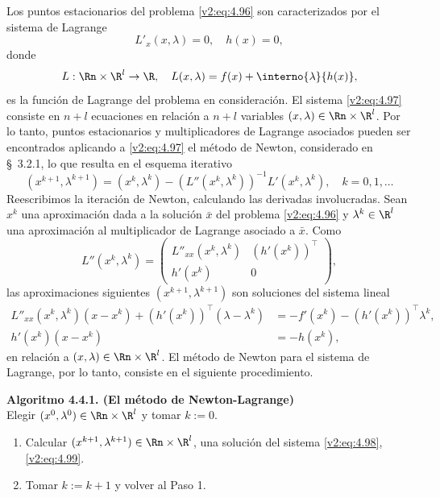 Los puntos estacionarios del problema \eqref{v2:eq:4.96} son caracterizados por el sistema de Lagrange
\begin{equation}
    L'_x(x, \lambda) = 0, \quad h(x) = 0,
    \label{v2:eq:4.97}
\end{equation}
donde
\[
    L : \Rn \times \R^l \to \R, \quad L(x, \lambda) = f(x) + \interno{\lambda}{h(x)},
\]
es la función de Lagrange del problema en consideración. El sistema \eqref{v2:eq:4.97} consiste en $n+l$ ecuaciones en relación a $n+l$ variables $(x, \lambda) \in \Rn \times \R^l$. Por lo tanto, puntos estacionarios y multiplicadores de Lagrange asociados pueden ser encontrados aplicando a \eqref{v2:eq:4.97} el método de Newton, considerado en \S~3.2.1, lo que resulta en el esquema iterativo
\[
    (x^{k+1}, \lambda^{k+1}) = (x^k, \lambda^k) - (L''(x^k, \lambda^k))^{-1} L'(x^k, \lambda^k), \quad k=0, 1, \dots
\]
Reescribimos la iteración de Newton, calculando las derivadas involucradas. Sean $x^k$ una aproximación dada a la solución $\bar{x}$ del problema \eqref{v2:eq:4.96} y $\lambda^k \in \R^l$ una aproximación al multiplicador de Lagrange asociado a $\bar{x}$. Como
\[
    L''(x^k, \lambda^k) = \begin{pmatrix} L''_{xx}(x^k, \lambda^k) & (h'(x^k))^\top \\ h'(x^k) & 0 \end{pmatrix},
\]
las aproximaciones siguientes $(x^{k+1}, \lambda^{k+1})$ son soluciones del sistema lineal
\begin{align}
    L''_{xx}(x^k, \lambda^k)(x - x^k) + (h'(x^k))^\top (\lambda - \lambda^k) &= -f'(x^k) - (h'(x^k))^\top \lambda^k, \label{v2:eq:4.98} \\
    h'(x^k)(x - x^k) &= -h(x^k), \label{v2:eq:4.99}
\end{align}
en relación a $(x, \lambda) \in \Rn \times \R^l$. El método de Newton para el sistema de Lagrange, por lo tanto, consiste en el siguiente procedimiento.

\vspace{0.3cm}
\noindent\textbf{Algoritmo 4.4.1. (El método de Newton-Lagrange)}\\
Elegir $(x^0, \lambda^0) \in \Rn \times \R^l$ y tomar $k:=0$.
\begin{enumerate}
    \item Calcular $(x^{k+1}, \lambda^{k+1}) \in \Rn \times \R^l$, una solución del sistema \eqref{v2:eq:4.98}, \eqref{v2:eq:4.99}.
    \item Tomar $k:=k+1$ y volver al Paso 1.
\end{enumerate}
\vspace{0.3cm}

